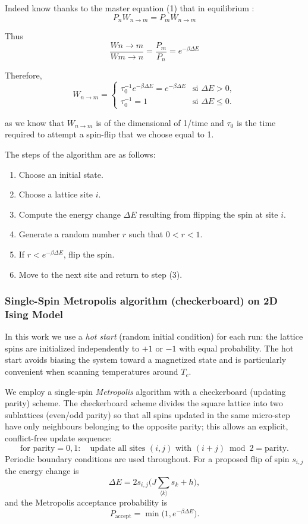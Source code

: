 Indeed know thanks to the master equation (1) that in equilibrium : 
\[P_n W_{n\to m} = P_m W_{n\to m }\]

Thus \[\frac{Wn\to m}{Wm\to n} = \frac{P_m}{P_n} = e^{-\beta \Delta E}\]

Therefore, \[
W_{n\to m} =
\begin{cases}
\tau_0^{-1} e^{-\beta \Delta E} = e^{-\beta \Delta E} & \text{si } \Delta E > 0,\\
\tau_0^{-1} = 1 & \text{si } \Delta E \le 0.
\end{cases}
\]

as we know that $W_{n\to m}$ is of the dimensional of 1/time and $\tau_0$ is the time required to attempt a spin-flip that we choose equal to 1. 

The steps of the algorithm are as follows:
\begin{enumerate}
  \item Choose an initial state.
  \item Choose a lattice site $i$.
  \item Compute the energy change $\Delta E$ resulting from flipping the spin at site $i$.
  \item Generate a random number $r$ such that $0 < r < 1$.
  \item If $r < e^{-\beta \Delta E}$, flip the spin.
  \item Move to the next site and return to step (3).
\end{enumerate}


\subsubsection{Single-Spin Metropolis algorithm (checkerboard) on 2D Ising Model}

In this work we use a \emph{hot start} (random initial condition) for each run:
the lattice spins are initialized independently to \(+1\) or \(-1\) with equal
probability. The hot start avoids biasing the system toward a magnetized
state and is particularly convenient when scanning temperatures around \(T_c\).

We employ a single-spin \emph{Metropolis} algorithm with a checkerboard
(updating parity) scheme. The checkerboard scheme divides the square lattice
into two sublattices (even/odd parity) so that all spins updated in the same
micro-step have only neighbours belonging to the opposite parity; this allows
an explicit, conflict-free update sequence:
\[
\text{for parity}=0,1:\quad \text{update all sites }(i,j)\text{ with }(i+j)\bmod 2=\text{parity}.
\]
Periodic boundary conditions are used throughout. For a proposed flip of spin
\(s_{i,j}\) the energy change is
\[
\Delta E = 2 s_{i,j} \Big( J\sum_{\langle k\rangle} s_k + h \Big),
\]
and the Metropolis acceptance probability is
\[
P_\text{accept} = \min\big(1, e^{-\beta\Delta E}\big).
\]


